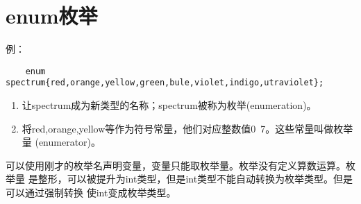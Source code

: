 \documentclass[UTF8]{ctexrep}
\begin{document}
\section{enum枚举}
例：
\begin{lstlisting}
    enum spectrum{red,orange,yellow,green,bule,violet,indigo,utraviolet};
\end{lstlisting}
\begin{enumerate}
    \item 让spectrum成为新类型的名称；spectrum被称为枚举(enumeration)。
    \item 将red,orange,yellow等作为符号常量，他们对应整数值0~7。这些常量叫做枚举量
(enumerator)。
\end{enumerate}

可以使用刚才的枚举名声明变量，变量只能取枚举量。枚举没有定义算数运算。枚举量
是整形，可以被提升为int类型，但是int类型不能自动转换为枚举类型。但是可以通过强制转换
使int变成枚举类型。








\end{document}
